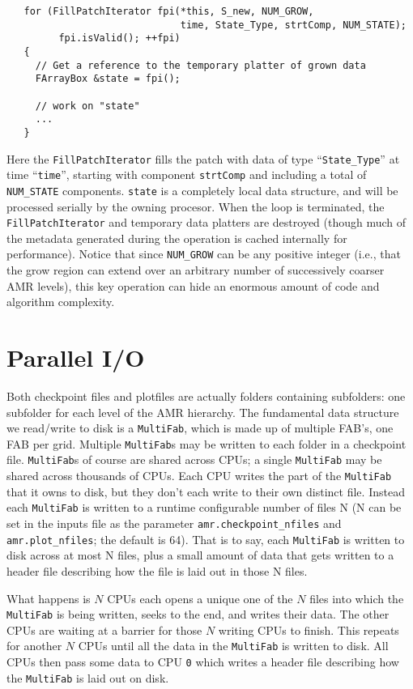 \begin{lstlisting}
   for (FillPatchIterator fpi(*this, S_new, NUM_GROW,
                              time, State_Type, strtComp, NUM_STATE);
         fpi.isValid(); ++fpi)
   {
     // Get a reference to the temporary platter of grown data
     FArrayBox &state = fpi();

     // work on "state"
     ...
   }           
\end{lstlisting}
Here the {\tt FillPatchIterator} fills the patch 
with data of type ``{\tt State\_Type}'' at time ``{\tt time}'',
starting with component {\tt strtComp} and including a total of
{\tt NUM\_STATE} components.  {\tt state} is a completely local
data structure, and will be processed serially by the owning 
procesor.  When the loop is terminated, the {\tt FillPatchIterator} 
and temporary data platters are destroyed (though much of the 
metadata generated during the operation is cached internally
for performance).  Notice that since {\tt NUM\_GROW} can be any
positive integer (i.e., that the grow region can extend over an arbitrary 
number of successively coarser AMR levels), this key operation can hide an
enormous amount of code and algorithm complexity.

\section{Parallel I/O}

Both checkpoint files and plotfiles are actually folders containing
subfolders: one subfolder for each level of the AMR hierarchy.
The fundamental data structure we read/write to disk is a {\tt MultiFab},
which is made up of multiple FAB's, one FAB per grid.  Multiple
{\tt MultiFab}s may be written to each folder in a checkpoint file.
{\tt MultiFab}s of course are shared across CPUs; a single {\tt MultiFab} may be
shared across thousands of CPUs.  Each CPU writes the part of the
{\tt MultiFab} that it owns to disk, but they don't each write to their own
distinct file.  Instead each {\tt MultiFab} is written to a runtime
configurable number of files N (N can be set in the inputs file as the
parameter {\tt amr.checkpoint\_nfiles} and {\tt amr.plot\_nfiles}; the
default is 64).  That is to say, each {\tt MultiFab} is written to disk
across at most N files, plus a small amount of data that gets written
to a header file describing how the file is laid out in those N files.

What happens is $N$ CPUs each opens a unique one of the $N$ files into
which the {\tt MultiFab} is being written, seeks to the end, and writes
their data.  The other CPUs are waiting at a barrier for those $N$
writing CPUs to finish.  This repeats for another $N$ CPUs until all the
data in the {\tt MultiFab} is written to disk.  All CPUs then pass some data
to CPU {\tt 0} which writes a header file describing how the {\tt MultiFab} is
laid out on disk.

